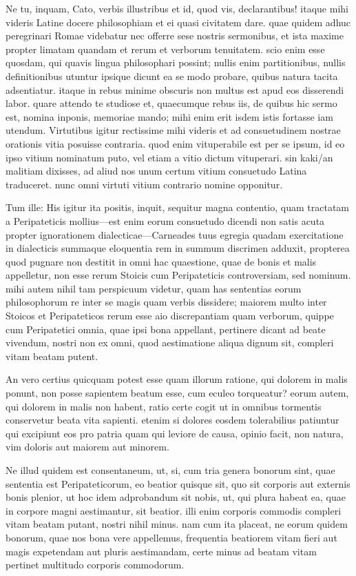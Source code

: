  Ne tu, inquam, Cato, verbis illustribus et id, quod vis, declarantibus! itaque mihi videris Latine docere philosophiam et ei quasi civitatem dare. quae quidem adhuc peregrinari Romae videbatur nec offerre sese nostris sermonibus, et ista maxime propter limatam quandam et rerum et verborum tenuitatem. scio enim esse quosdam, qui quavis lingua philosophari possint; nullis enim partitionibus, nullis definitionibus utuntur ipsique dicunt ea se modo probare, quibus natura tacita adsentiatur. itaque in rebus minime obscuris non multus est apud eos disserendi labor. quare attendo te studiose et, quaecumque rebus iis, de quibus hic sermo est, nomina inponis, memoriae mando; mihi enim erit isdem istis fortasse iam utendum. Virtutibus igitur rectissime mihi videris et ad consuetudinem nostrae orationis vitia posuisse contraria. quod enim vituperabile est per se ipsum, id eo ipso vitium nominatum puto, vel etiam a vitio dictum vituperari. sin kaki/an malitiam dixisses, ad aliud nos unum certum vitium consuetudo Latina traduceret. nunc omni virtuti vitium contrario nomine opponitur.

 Tum ille: His igitur ita positis, inquit, sequitur magna contentio, quam tractatam a Peripateticis mollius—est enim eorum consuetudo dicendi non satis acuta propter ignorationem dialecticae—Carneades tuus egregia quadam exercitatione in dialecticis summaque eloquentia rem in summum discrimen adduxit, propterea quod pugnare non destitit in omni hac quaestione, quae de bonis et malis appelletur, non esse rerum Stoicis cum Peripateticis controversiam, sed nominum. mihi autem nihil tam perspicuum videtur, quam has sententias eorum philosophorum re inter se magis quam verbis dissidere; maiorem multo inter Stoicos et Peripateticos rerum esse aio discrepantiam quam verborum, quippe cum Peripatetici omnia, quae ipsi bona appellant, pertinere dicant ad beate vivendum, nostri non ex omni, quod aestimatione aliqua dignum sit, compleri vitam beatam putent.

 An vero certius quicquam potest esse quam illorum ratione, qui dolorem in malis ponunt, non posse sapientem beatum esse, cum eculeo torqueatur? eorum autem, qui dolorem in malis non habent, ratio certe cogit ut in omnibus tormentis conservetur beata vita sapienti. etenim si dolores eosdem tolerabilius patiuntur qui excipiunt eos pro patria quam qui leviore de causa, opinio facit, non natura, vim doloris aut maiorem aut minorem.

 Ne illud quidem est consentaneum, ut, si, cum tria genera bonorum sint, quae sententia est Peripateticorum, eo beatior quisque sit, quo sit corporis aut externis bonis plenior, ut hoc idem adprobandum sit nobis, ut, qui plura habeat ea, quae in corpore magni aestimantur, sit beatior. illi enim corporis commodis compleri vitam beatam putant, nostri nihil minus. nam cum ita placeat, ne eorum quidem bonorum, quae nos bona vere appellemus, frequentia beatiorem vitam fieri aut magis expetendam aut pluris aestimandam, certe minus ad beatam vitam pertinet multitudo corporis commodorum.

